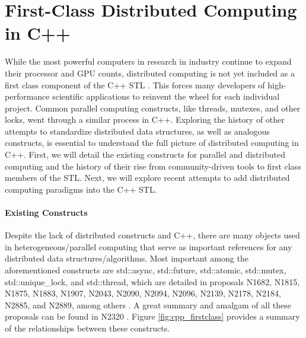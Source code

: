 \section{First-Class Distributed Computing in C++} \label{first_class_dist_cpp}
While the most powerful computers in research in industry continue to expand their processor and GPU counts,
distributed computing is not yet included as a first class component of the C++ STL \cite{towards_dist_cpp}. This forces many developers of high-performance scientific applications to reinvent the wheel for each individual project.  Common parallel computing constructs, like threads, mutexes, and other locks, went through a similar process in C++. Exploring the history of other attempts to standardize distributed data structures, as well as analogous constructs, is essential to understand the full picture of distributed computing in C++. First, we will detail the existing constructs for parallel and distributed computing and the history of their rise from community-driven tools to first class members of the STL. Next, we will explore recent attempts to add distributed computing paradigms into the C++ STL. 


\paragraph{Existing Constructs}
Despite the lack of distributed constructs and C++, there are many objects used in heterogeneous/parallel computing that serve as important references for any distributed data structures/algorithms. Most important among the aforementioned constructs are std::async, std::future, std::atomic, std::mutex, std::unique\_lock, and std::thread, which are detailed in proposals N1682, N1815, N1875, N1883, N1907, N2043, N2090, N2094,  N2096, N2139, N2178, N2184, N2885, and N2889, among others  \cite{n1682} \cite{n1815} \cite{n1875} \cite{n1883} \cite{n1907} \cite{n2043} \cite{n2096} \cite{n2139} \cite{n2178} \cite{n2184} \cite{n2285} \cite{n2889}. A great summary and amalgam of all these proposals can be found in N2320 \cite{n2320}. Figure \ref{fig:cpp_firstclass} provides a summary of the relationships between these constructs.

